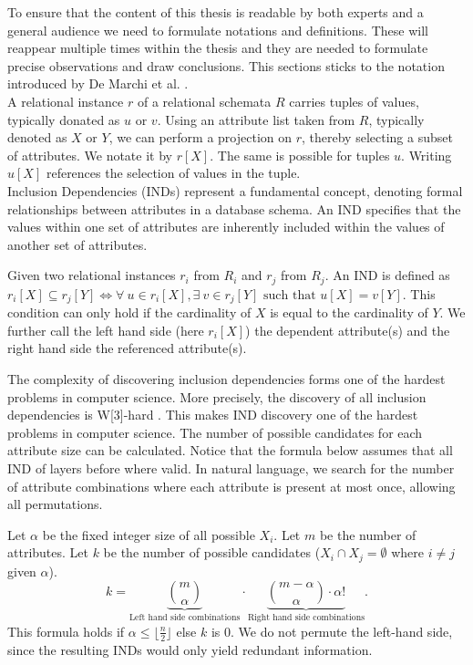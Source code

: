 To ensure that the content of this thesis is readable by both experts and a general audience we need to formulate notations and definitions. These will reappear multiple times within the thesis and they are needed to formulate precise observations and draw conclusions. This sections sticks to the notation introduced by De Marchi et al. \cite{marchi2009unary}. \\

\noindent A relational instance $r$ of a relational schemata $R$ carries tuples of values, typically donated as $u$ or $v$. Using an attribute list taken from $R$, typically denoted as $X$ or $Y$, we can perform a projection on $r$, thereby selecting a subset of attributes. We notate it by $r[X]$. The same is possible for tuples $u$. Writing $u[X]$ references the selection of values in the tuple. \\

Inclusion Dependencies (INDs) represent a fundamental concept, denoting formal relationships between attributes in a database schema. An IND specifies that the values within one set of attributes are inherently included within the values of another set of attributes.

\begin{definition}\label{def:inds}
    Given two relational instances $r_i$ from $R_i$ and $r_j$ from $R_j$. An IND is defined as $r_i[X] \subseteq r_j[Y] \iff \forall \: u \in r_i[X], \exists \: v \in r_j[Y] \text{ such that } u[X] = v[Y]$. This condition can only hold if the cardinality of $X$ is equal to the cardinality of $Y$. We further call the left hand side (here $r_i[X]$) the dependent attribute(s) and the right hand side the referenced attribute(s).
\end{definition}

The complexity of discovering inclusion dependencies forms one of the hardest problems in computer science. More precisely, the discovery of all inclusion dependencies is W[3]-hard \cite{blasius2017parameterized}. This makes IND discovery one of the hardest problems in computer science. The number of possible candidates for each attribute size can be calculated. Notice that the formula below assumes that all IND of layers before where valid. In natural language, we search for the number of attribute combinations where each attribute is present at most once, allowing all permutations.

\begin{definition}\label{def:candidates}
    Let $\alpha$ be the fixed integer size of all possible $X_i$. Let $m$ be the number of attributes. Let $k$ be the number of possible candidates ($X_i \cap X_j = \emptyset$ where $i \not = j$ given $\alpha$).
    \[
        k = \underbrace{\binom{m}{\alpha}}_{\text{Left hand side combinations}} \cdot \underbrace{\binom{m-\alpha}{\alpha}\cdot \alpha!}_\text{Right hand side combinations}.
    \]
    This formula holds if $\alpha \leq \lfloor \frac{n}{2} \rfloor$ else $k$ is $0$. We do not permute the left-hand side, since the resulting INDs would only yield redundant information.
\end{definition}

